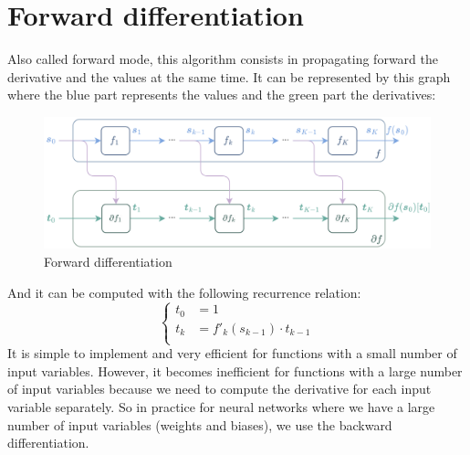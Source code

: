 \documentclass[12pt, openany]{report}
\theoremstyle{definition}
\begin{document}
\section{Forward differentiation}
Also called forward mode, this algorithm consists in propagating forward the derivative and the values at the same time. It can be represented by this graph where the blue part represents the values and the green part the derivatives:
\begin{figure}[H]
    \centering
    \includegraphics[width=\textwidth]{img/forward_diff.png}
    \caption{Forward differentiation}
    \label{fig:forward_diff}
\end{figure}
And it can be computed with the following recurrence relation:
\begin{equation}
  \begin{cases}
    t_0 &= 1 \\
    t_k &= f'_k(s_{k-1}) \cdot t_{k-1}\\
  \end{cases}
\end{equation}
It is simple to implement and very efficient for functions with a small number of input variables. However, it becomes inefficient for functions with a large number of input variables because we need to compute the derivative for each input variable separately. So in practice for neural networks where we have a large number of input variables (weights and biases), we use the backward differentiation.
\end{document}
